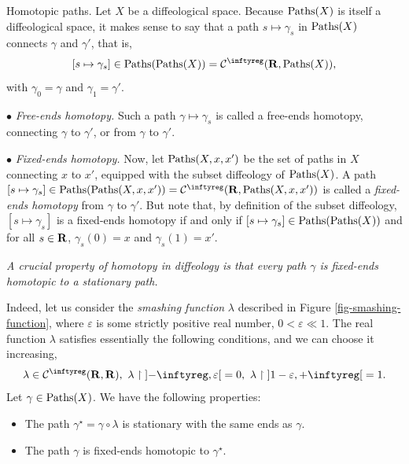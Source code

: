 \begin{Article}{Homotopic paths.}{}
    \label{Homotopy-of-paths}
    Let $X$ be a diffeological space.
    Because $\operatorname{Paths}(X)$ is itself a diffeological space,
    it makes sense to say that a path $s \mapsto \gamma_s$ in $\operatorname{Paths}(X)$
    connects $\gamma$ and $\gamma'$, that is,
    $$%
    [s \mapsto \gamma_s] \in \Paths(\Paths(X)) = \Cinfty(\RR, \Paths(X)),
    $$%
    with  $\gamma_0 = \gamma$ and $\gamma_1 = \gamma'$.

    $\bullet$ \emph{Free-ends homotopy.}
    Such a path $\gamma \mapsto \gamma_s$ is called a free-ends homotopy,
    connecting $\gamma$ to $\gamma'$,
    or from $\gamma$ to $\gamma'$.

    $\bullet$ \emph{Fixed-ends homotopy.}
    Now,
    let $\operatorname{Paths}(X,x,x')$ be the set of paths in $X$ connecting $x$ to $x'$,
    equipped with the subset diffeology of $\operatorname{Paths}(X)$.
    A path $[s \mapsto \gamma_s] \in \Paths(\Paths(X,x,x')) =  \Cinfty(\RR,\Paths(X,x,x'))$ is called a \emph{fixed-ends homotopy} from $\gamma$ to $\gamma'$.
    But note that,
    by definition of the subset diffeology,
    $[s \mapsto \gamma_s]$ is a fixed-ends homotopy if and only if $[s \mapsto \gamma_s] \in \operatorname{Paths}(\operatorname{Paths}(X))$ and for all $s \in \mathbf{R}$, $\gamma_s(0) = x$ and $\gamma_s(1) = x'$.

     {\itshape A crucial property of homotopy in diffeology is that every path $\gamma$ is fixed-ends homotopic to a stationary path.}

    Indeed,
    let us consider the \emph{smashing function\/} $\lambda$ described in Figure \ref{fig-smashing-function},
    where $\varepsilon$ is some strictly positive real number, $0 < \varepsilon \ll 1$.
    The real function $\lambda$ satisfies essentially the following conditions, and we can choose it increasing,
    $$%
    \lambda \in \Cinfty(\RR,\RR), \ \lambda \restriction \OpenInterval{-\infty,\varepsilon} = 0, \ \lambda \restriction \OpenInterval{1-\varepsilon, + \infty} = 1.
    $$%
    Let $\gamma \in \operatorname{Paths}(X)$.
    We have the following properties:
    \enlargethispage{1mm} %
    \begin{itemize}
      \item[a)] The path $\gamma^\star = \gamma \circ \lambda$ is stationary with the same ends as $\gamma$.
      \item[b)] The path $\gamma$ is fixed-ends homotopic to $\gamma^\star$.
    \end{itemize}
    

\end{Article}
